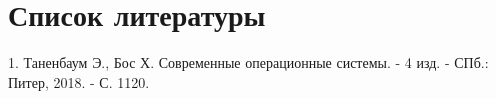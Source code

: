 \newpage
\chapter*{Список литературы}

1.	Таненбаум Э., Бос Х.  Современные операционные системы. - 4 изд. - СПб.: Питер, 2018. - С. 1120. 